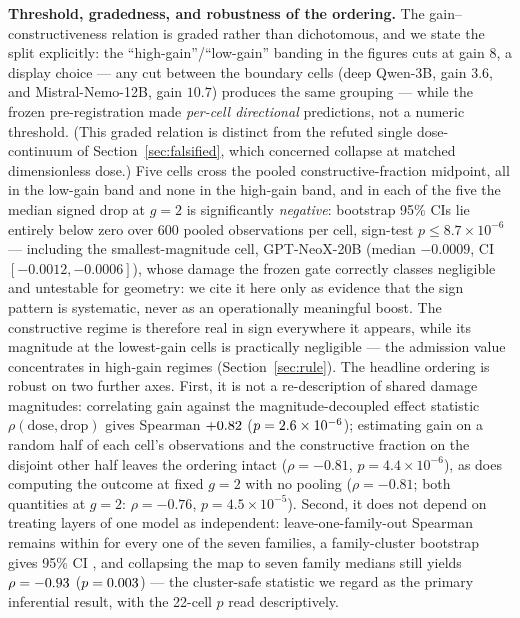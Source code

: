 \documentclass[preprint,12pt]{elsarticle}
\begin{document}
\textbf{Threshold, gradedness, and robustness of the ordering.} The
gain--constructiveness relation is graded rather than dichotomous, and we state the
split explicitly: the ``high-gain''/``low-gain'' banding in the figures cuts at gain
$8$, a display choice --- any cut between the boundary cells (deep Qwen-3B, gain
$3.6$, and Mistral-Nemo-12B, gain $10.7$) produces the same grouping --- while the
frozen pre-registration made \emph{per-cell directional} predictions, not a numeric
threshold. (This graded relation is distinct from the refuted single dose-continuum
of Section~\ref{sec:falsified}, which concerned collapse at matched dimensionless
dose.) Five cells cross the pooled constructive-fraction midpoint, all in the
low-gain band and none in the high-gain band, and in each of the five the median
signed drop at $g{=}2$ is significantly \emph{negative}: bootstrap 95\% CIs lie
entirely below zero over 600 pooled observations per cell, sign-test
$p\leq 8.7\times10^{-6}$ --- including the smallest-magnitude cell, GPT-NeoX-20B
(median $-0.0009$, CI $[-0.0012,-0.0006]$), whose damage the frozen gate correctly
classes negligible and untestable for geometry: we cite it here only as evidence that
the sign pattern is systematic, never as an operationally meaningful boost. The
constructive regime is therefore real in sign everywhere it appears, while its
magnitude at the lowest-gain cells is practically negligible --- the admission value
concentrates in high-gain regimes (Section~\ref{sec:rule}). The headline ordering is
robust on two further axes. First, it is not a re-description of shared damage
magnitudes: correlating gain against the magnitude-decoupled effect statistic
$\rho(\mathrm{dose},\mathrm{drop})$ gives Spearman $+0.82{}$
($p=2.6\times10^{-6}{}$); estimating gain on a random half of each cell's observations
and the constructive fraction on the disjoint other half leaves the ordering intact
($\rho=-0.81$, $p=4.4\times10^{-6}$), as does computing the outcome at fixed $g{=}2$
with no pooling ($\rho=-0.81$; both quantities at $g{=}2$: $\rho=-0.76$,
$p=4.5\times10^{-5}$). Second, it does not depend on treating layers of one model as
independent: leave-one-family-out Spearman remains within \lofoRange{} for every one
of the seven families, a family-cluster bootstrap gives 95\% CI \famBootCI{}, and
collapsing the map to seven family medians still yields $\rho=-0.93{}$
($p=0.003{}$) --- the cluster-safe statistic we regard as the primary
inferential result, with the 22-cell $p$ read descriptively.
\end{document}
